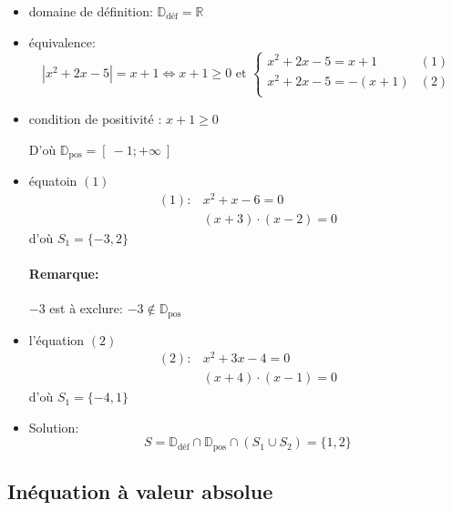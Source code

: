 \documentclass[
    11pt,
    a4paper,
    oneside,
    headinlcude, footinclude,
    twoside,
]{report}
\begin{document}
\begin{itemize}
    \item domaine de d\'efinition: $\mathbb{D}_{\text{d\'ef}} = \mathbb{R}$
    \item \'equivalence:
        $$| x^{2} + 2x - 5| = x + 1 \iff x + 1 \geq 0 \text{ et } \left\{
            \begin{array}{lc}
            x^{2} + 2 x - 5 = x+1 & (1)\\
            x^{2} + 2 x - 5 = -(x+1) & (2)\\
            \end{array}
        \right.$$

    \item condition de positivit\'e : $x + 1 \geq 0$

        D'o\`u $\mathbb{D}_{\text{pos}} = [\ -1; + \infty\ ]$

    \item \'equatoin $(1)$
        \[
            \begin{split}
               (1):& x^{2} + x - 6 = 0     \\
               &(x+3) \cdot (x-2) = 0
            \end{split}
        \]
        d'o\`u $S_{1} = \{-3, 2\}$

        \paragraph{Remarque:}
        
        $-3$ est \`a exclure: $-3 \notin \mathbb{D}_{\text{pos}}$

    \item l'\'equation $(2)$
        \[
            \begin{split}
               (2):& x^{2} + 3x - 4 = 0     \\
               &(x+4) \cdot (x-1) = 0
            \end{split}
        \]
        d'o\`u $S_{1} = \{-4, 1\}$

    \item Solution: $$S = \mathbb{D}_{\text{d\'ef}} \cap \mathbb{D}_{\text{pos}} \cap (S_{1}
        \cup S_{2}) = \{1, 2\}$$

\end{itemize}

\subsection{In\'equation \`a valeur absolue}
\label{sub:in'equation_`a_valeur_absolue}
\end{document}
